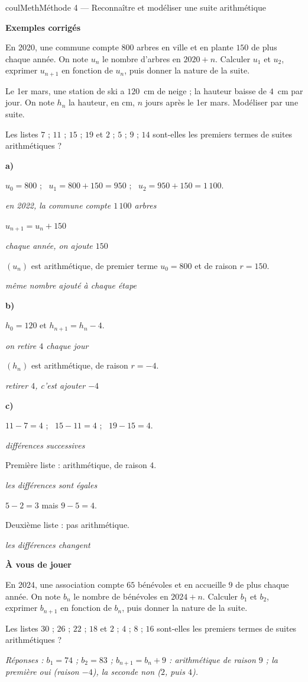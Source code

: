 \documentclass[11pt,a4paper]{article}
\makeatletter
\newcounter{lycee@signet}
\newcommand{\signet}[3][]{\stepcounter{lycee@signet}%
  \edef\lycee@dest{\if\relax\detokenize{#1}\relax
    signet.\arabic{lycee@signet}\else#1\fi}%
  \hypertarget{\lycee@dest}{}\bookmark[level=#2,dest=\lycee@dest]{#3}}
\def\textsuperscript#1{#1}\def\dfrac#1#2{#1/#2}\def\frac#1#2{#1/#2}%
\newcommand{\res}[1]{#1}
\newcounter{methode}
\newenvironment{methodebox}[1][Méthode]{\stepcounter{methode}%
  \begin{boitecours}[phantom={\signet[methode-\arabic{methode}]{2}{#1}}]{coulMeth}{#1}}%
  {\end{boitecours}}
\newcommand{\etape}[1]{\par\smallskip\textbf{\color{coulMeth}#1}\par\nobreak\smallskip}
\newcommand{\reponse}[1]{\par\smallskip
  {\footnotesize\itshape\color{black!55}Réponses : #1}}
\newcommand{\explique}[2]{\par\smallskip\noindent
  \begin{minipage}[t]{0.57\linewidth}\raggedright #1\end{minipage}\hfill
  \begin{minipage}[t]{0.40\linewidth}\raggedright\leavevmode
    {\small\itshape\color{black!60}#2}\end{minipage}\par}
\newcommand{\cas}[1]{\par\smallskip\noindent\textbf{\color{coulExo}#1}\vadjust{\nobreak}}
\newenvironment{correction}{\par}{\par}
\newcommand{\etapeexemples}{\etape{Exemples corrigés}}
\makeatother
\begin{document}
\begin{methodebox}[Méthode 4 --- Reconnaître et modéliser une suite arithmétique]
\etapeexemples
\begin{questions}[label=\alph*)]
  \item En 2020, une commune compte $800$ arbres en ville et en plante $150$ de plus
        chaque année. On note $u_{n}$ le nombre d'arbres en $2020+n$. Calculer $u_{1}$
        et $u_{2}$, exprimer $u_{n+1}$ en fonction de $u_{n}$, puis donner la nature de
        la suite.
  \item Le 1\textsuperscript{er} mars, une station de ski a $120$~cm de neige ; la
        hauteur baisse de $4$~cm par jour. On note $h_{n}$ la hauteur, en cm, $n$ jours
        après le 1\textsuperscript{er} mars. Modéliser par une suite.
  \item Les listes $7$ ; $11$ ; $15$ ; $19$ \;et\; $2$ ; $5$ ; $9$ ; $14$ sont-elles
        les premiers termes de suites arithmétiques ?
\end{questions}
\begin{correction}
\cas{a)}
\explique{$u_{0}=800$ ; \ $u_{1}=800+150=\res{950}$ ; \ $u_{2}=950+150=\res{1\,100}$.}{en 2022,
la commune compte $1\,100$ arbres}
\explique{$u_{n+1}=\res{u_{n}+150}$}{chaque année, on ajoute $150$}
\explique{$(u_{n})$ est \res{arithmétique, de premier terme $u_{0}=800$ et de raison
$r=150$}.}{même nombre ajouté à chaque étape}
\cas{b)}
\explique{\res{$h_{0}=120$ et $h_{n+1}=h_{n}-4$}.}{on retire $4$ chaque jour}
\explique{$(h_{n})$ est \res{arithmétique, de raison $r=-4$}.}{retirer $4$, c'est ajouter
$-4$}
\cas{c)}
\explique{$11-7=4$ ; \ $15-11=4$ ; \ $19-15=4$.}{différences successives}
\explique{Première liste : \res{arithmétique, de raison $4$}.}{les différences sont égales}
\explique{$5-2=3$ mais $9-5=4$.}{}
\explique{Deuxième liste : \res{pas arithmétique}.}{les différences changent}
\end{correction}

\etape{À vous de jouer}
\begin{questions}
  \item En 2024, une association compte $65$ bénévoles et en accueille $9$ de plus
        chaque année. On note $b_{n}$ le nombre de bénévoles en $2024+n$. Calculer $b_{1}$
        et $b_{2}$, exprimer $b_{n+1}$ en fonction de $b_{n}$, puis donner la nature de
        la suite.
  \item Les listes $30$ ; $26$ ; $22$ ; $18$ \;et\; $2$ ; $4$ ; $8$ ; $16$ sont-elles
        les premiers termes de suites arithmétiques ?
\end{questions}
\reponse{$b_{1}=74$ ; $b_{2}=83$ ; $b_{n+1}=b_{n}+9$ : arithmétique de raison $9$ ;\; la première oui (raison
$-4$), la seconde non ($2$, puis $4$).}
\end{methodebox}
\end{document}
